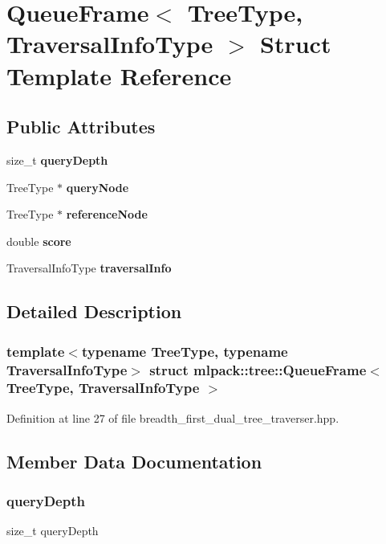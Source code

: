 \section{Queue\+Frame$<$ Tree\+Type, Traversal\+Info\+Type $>$ Struct Template Reference}
\label{structmlpack_1_1tree_1_1QueueFrame}
\subsection*{Public Attributes}
\begin{DoxyCompactItemize}
\item 
size\+\_\+t \textbf{ query\+Depth}
\item 
Tree\+Type $\ast$ \textbf{ query\+Node}
\item 
Tree\+Type $\ast$ \textbf{ reference\+Node}
\item 
double \textbf{ score}
\item 
Traversal\+Info\+Type \textbf{ traversal\+Info}
\end{DoxyCompactItemize}


\subsection{Detailed Description}
\subsubsection*{template$<$typename Tree\+Type, typename Traversal\+Info\+Type$>$\newline
struct mlpack\+::tree\+::\+Queue\+Frame$<$ Tree\+Type, Traversal\+Info\+Type $>$}



Definition at line 27 of file breadth\+\_\+first\+\_\+dual\+\_\+tree\+\_\+traverser.\+hpp.



\subsection{Member Data Documentation}
\mbox{\label{structmlpack_1_1tree_1_1QueueFrame_abc4607c498485d076651f5a93b006439}} 
\subsubsection{query\+Depth}
{\footnotesize\ttfamily size\+\_\+t query\+Depth}



